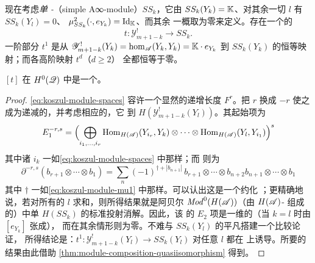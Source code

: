 现在考虑\emph{单 \trAinfty-\trModule}（simple A∞-module）$SS_k$，它由
$SS_k(Y_k)=\mathbb{K}$、对其余一切 $l$ 有 $SS_k(Y_l)=0$、
$\mu^2_{SS_k}(\cdot,e_{Y_k})=\mathrm{Id}_{\mathbb{K}}$、而其余\trStructureMap{}%
一概取为零来定义。存在一个\trCanonical{}的\trModule\trHomomorphism
\begin{equation*}
t\colon\mathscr{Y}^!_{m+1-k}\longrightarrow SS_k.
\end{equation*}
一阶部分 $t^1$ 是从 $\mathscr{Y}^!_{m+1-k}(Y_k)=\hom_{\mathscr{A}}(Y_k,Y_k)=
\mathbb{K}\cdot e_{Y_k}$ 到 $SS_k(Y_k)$ 的恒等映射；而各高阶映射 $t^d$（$d\ge 2$）
全都恒等于零。

\begin{lemma}\label{thm:yoneda-twisted-simple-iso}
$[t]$ 在 $H^0(\mathscr{Q})$ 中是一个\trIsomorphism。
\end{lemma}
\begin{proof}
\trChainComplex{} \eqref{eq:koszul-module-spaces} 容许一个显然的递增长度%
\trFiltration{} $F^r$。把 $r$
换成 $-r$ 使之成为递减的，并考虑相应的\trSpectralSequence，它\trConvergence{}%
到 $H(\mathscr{Y}^!_{m+1-k}(Y_l))$。其起始项为
\begin{equation*}
E_1^{-r,s}=\Bigl(\bigoplus_{i_1,\ldots,i_r}
\operatorname{Hom}_{H(\mathscr{A})}(Y_{i_r},Y_k)\otimes\cdots\otimes
\operatorname{Hom}_{H(\mathscr{A})}(Y_l,Y_{i_1})\Bigr)^{s}
\end{equation*}
其中诸 $i_k$ 一如\eqref{eq:koszul-module-spaces} 中那样；而\trDifferential{}%
则为
\begin{equation*}
\partial^{-r,s}(b_{r+1}\otimes\cdots\otimes b_1)
=\sum_n(-1)^{\dagger+|b_{n+1}|}\,b_{r+1}\otimes\cdots\otimes b_{n+2}b_{n+1}
\otimes\cdots\otimes b_1
\end{equation*}
其中 $\dagger$ 一如\eqref{eq:koszul-module-mu1} 中那样。可以认出这是一个约化%
\trBarResolution；更精确地说，若对所有的 $l$ 求和，则所得结果就是阿贝尔%
\trCategory{} $\mathit{Mod}^0(H(\mathscr{A}))$（由\trGraded{} $H(\mathscr{A})$-\trModule{}%
组成的\trCategory）中单\trObject{} $H(SS_k)$ 的标准投射消解。因此，该%
\trSpectralSequence{}的 $E_2$ 项是一维的（当 $k=l$ 时由 $[e_{Y_k}]$ 张成），
而在其余情形则为零。不难与 $SS_k(Y_l)$ 的平凡\trFiltration{}搭建一个比较论证，
所得结论是：$t^1\colon\mathscr{Y}^!_{m+1-k}(Y_l)\to SS_k(Y_l)$ 对任意 $l$ 都在%
\trCohomology{}上诱导\trIsomorphism。所要的结果由此借助
\cref{thm:module-composition-quasiisomorphism} 得到。
\end{proof}

